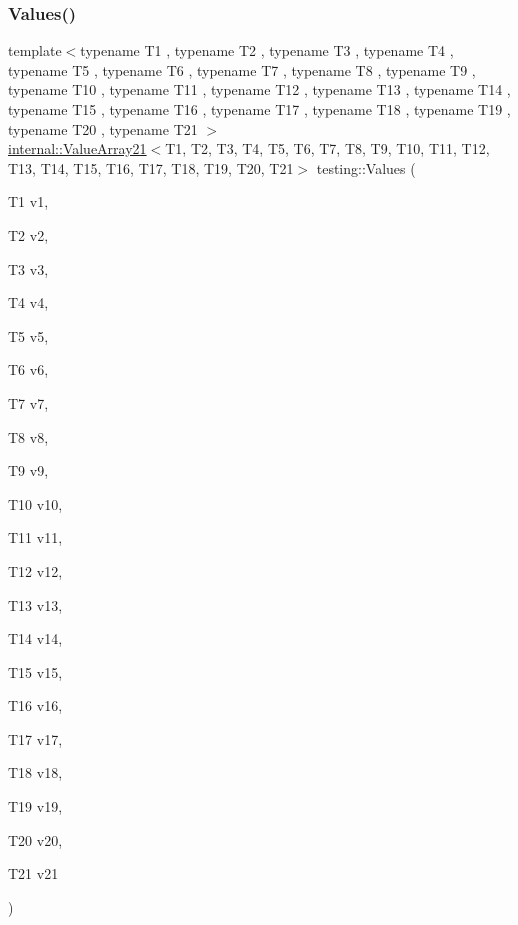 \subsubsection{\texorpdfstring{Values()}{Values()}\hspace{0.1cm}{\footnotesize\ttfamily [22/51]}}
{\footnotesize\ttfamily template$<$typename T1 , typename T2 , typename T3 , typename T4 , typename T5 , typename T6 , typename T7 , typename T8 , typename T9 , typename T10 , typename T11 , typename T12 , typename T13 , typename T14 , typename T15 , typename T16 , typename T17 , typename T18 , typename T19 , typename T20 , typename T21 $>$ \\
\mbox{\hyperlink{classtesting_1_1internal_1_1_value_array21}{internal\+::\+Value\+Array21}}$<$T1, T2, T3, T4, T5, T6, T7, T8, T9, T10, T11, T12, T13, T14, T15, T16, T17, T18, T19, T20, T21$>$ testing\+::\+Values (\begin{DoxyParamCaption}\item[{T1}]{v1,  }\item[{T2}]{v2,  }\item[{T3}]{v3,  }\item[{T4}]{v4,  }\item[{T5}]{v5,  }\item[{T6}]{v6,  }\item[{T7}]{v7,  }\item[{T8}]{v8,  }\item[{T9}]{v9,  }\item[{T10}]{v10,  }\item[{T11}]{v11,  }\item[{T12}]{v12,  }\item[{T13}]{v13,  }\item[{T14}]{v14,  }\item[{T15}]{v15,  }\item[{T16}]{v16,  }\item[{T17}]{v17,  }\item[{T18}]{v18,  }\item[{T19}]{v19,  }\item[{T20}]{v20,  }\item[{T21}]{v21 }\end{DoxyParamCaption})}

\mbox{\label{namespacetesting_aadfff0d803156b98ff1ffa5f1d95c350}} 
